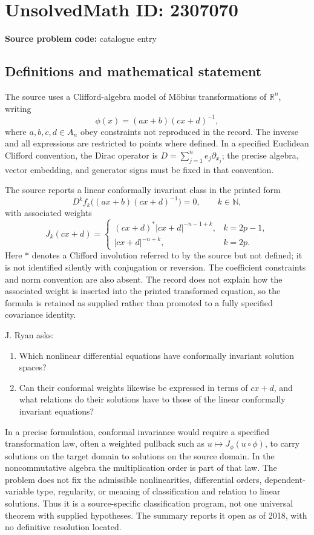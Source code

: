 \documentclass[11pt]{article}
\newcommand{\N}{\mathbb{N}}
\newcommand{\R}{\mathbb{R}}
\begin{document}
\section*{UnsolvedMath ID: 2307070}
\textbf{Source problem code:} catalogue entry
\subsection{Definitions and mathematical statement}
The source uses a Clifford-algebra model of M\"obius transformations of $\R^n$, writing
\[
\phi(x)=(ax+b)(cx+d)^{-1},
\]
where $a,b,c,d\in A_n$ obey constraints not reproduced in the record. The inverse and all expressions are restricted to points where defined. In a specified Euclidean Clifford convention, the Dirac operator is $D=\sum_{j=1}^n e_j\partial_{x_j}$; the precise algebra, vector embedding, and generator signs must be fixed in that convention.

The source reports a linear conformally invariant class in the printed form
\[
D^k f_k\bigl((ax+b)(cx+d)^{-1}\bigr)=0,\qquad k\in\N,
\]
with associated weights
\[
J_k(cx+d)=
\begin{cases}
(cx+d)^*|cx+d|^{-n-1+k},&k=2p-1,\\
|cx+d|^{-n+k},&k=2p.
\end{cases}
\]
Here $*$ denotes a Clifford involution referred to by the source but not defined; it is not identified silently with conjugation or reversion. The coefficient constraints and norm convention are also absent. The record does not explain how the associated weight is inserted into the printed transformed equation, so the formula is retained as supplied rather than promoted to a fully specified covariance identity.

J. Ryan asks:
\begin{enumerate}
\item Which nonlinear differential equations have conformally invariant solution spaces?
\item Can their conformal weights likewise be expressed in terms of $cx+d$, and what relations do their solutions have to those of the linear conformally invariant equations?
\end{enumerate}
In a precise formulation, conformal invariance would require a specified transformation law, often a weighted pullback such as $u\mapsto J_\phi(u\circ\phi)$, to carry solutions on the target domain to solutions on the source domain. In the noncommutative algebra the multiplication order is part of that law. The problem does not fix the admissible nonlinearities, differential orders, dependent-variable type, regularity, or meaning of classification and relation to linear solutions. Thus it is a source-specific classification program, not one universal theorem with supplied hypotheses. The summary reports it open as of 2018, with no definitive resolution located.
\end{document}
